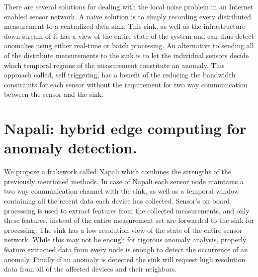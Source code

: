 There are several solutions for dealing with the local noise problem in an Internet enabled sensor network. A naive solution is to simply recording every distributed measurement to a centralized data sink. This sink, as well as the infrastructure down stream of it has a view of the entire state of the system and can thus detect anomalies using either real-time or batch processing. An alternative to sending all of the distribute measurements to the sink is to let the individual sensors decide which temporal regions of the measurement constitute an anomaly. This approach called, self triggering, has a benefit of the reducing the bandwidth constraints for each sensor without the requirement for two way communication between the sensor and the sink.

\section{Napali: hybrid edge computing for anomaly detection.} \label{intro:section:napali}
  
We propose a frakework called Napali which combines the strengths of the previously mentioned methods. In case of Napali each sensor node maintains a two way communication channel with the sink, as well as a temporal window containing all the recent data each device has collected. Sensor's on board processing is used to extract features from the collected measurements, and only these features, instead of the entire measurement set are forwarded to the sink for processing. The sink has a low resolution view of the state of the entire sensor network. While this may not be enough for rigorous anomaly analysis, properly feature extracted data from every node is enough to detect the occurrence of an anomaly. Finally if an anomaly is detected the sink will request high resolution data from all of the affected devices and their neighbors. 

